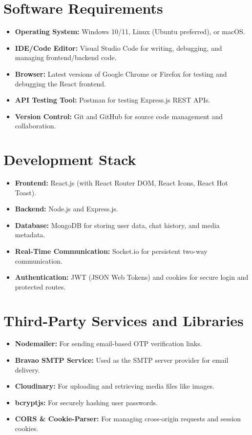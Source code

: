 \documentclass[12pt,a4paper]{report}
\begin{document}
\section{Software Requirements}
\begin{itemize}
    \item \textbf{Operating System:} Windows 10/11, Linux (Ubuntu preferred), or macOS.
    \item \textbf{IDE/Code Editor:} Visual Studio Code for writing, debugging, and managing frontend/backend code.
    \item \textbf{Browser:} Latest versions of Google Chrome or Firefox for testing and debugging the React frontend.
    \item \textbf{API Testing Tool:} Postman for testing Express.js REST APIs.
    \item \textbf{Version Control:} Git and GitHub for source code management and collaboration.
\end{itemize}

\section{Development Stack}
\begin{itemize}
    \item \textbf{Frontend:} React.js (with React Router DOM, React Icons, React Hot Toast).
    \item \textbf{Backend:} Node.js and Express.js.
    \item \textbf{Database:} MongoDB for storing user data, chat history, and media metadata.
    \item \textbf{Real-Time Communication:} Socket.io for persistent two-way communication.
    \item \textbf{Authentication:} JWT (JSON Web Tokens) and cookies for secure login and protected routes.
\end{itemize}

\section{Third-Party Services and Libraries}
\begin{itemize}
    \item \textbf{Nodemailer:} For sending email-based OTP verification links.
    \item \textbf{Bravao SMTP Service:} Used as the SMTP server provider for email delivery.
    \item \textbf{Cloudinary:} For uploading and retrieving media files like images.
    \item \textbf{bcryptjs:} For securely hashing user passwords.
    \item \textbf{CORS \& Cookie-Parser:} For managing cross-origin requests and session cookies.
\end{itemize}
\end{document}
